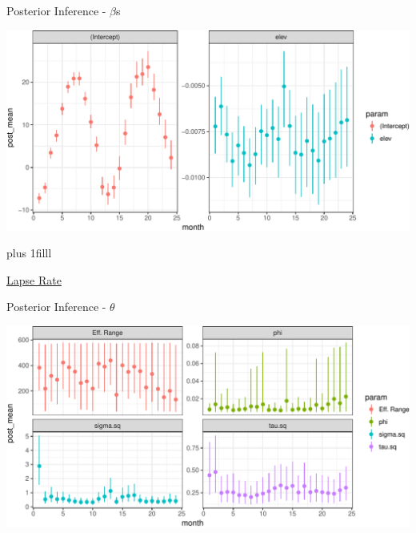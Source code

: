 \documentclass[11pt,ignorenonframetext,]{beamer}
\newcommand{\vvfill}{\vskip0pt plus 1filll}
\begin{document}
\begin{frame}{Posterior Inference - \(\beta\)s}

\vspace{4mm}

\includegraphics{Lec23_files/figure-beamer/unnamed-chunk-8-1.pdf}

\vvfill

\scriptsize

\href{https://en.wikipedia.org/wiki/Lapse_rate}{Lapse Rate}

\end{frame}

\begin{frame}{Posterior Inference - \(\theta\)}

\vspace{4mm}

\includegraphics{Lec23_files/figure-beamer/unnamed-chunk-9-1.pdf}

\end{frame}
\end{document}
